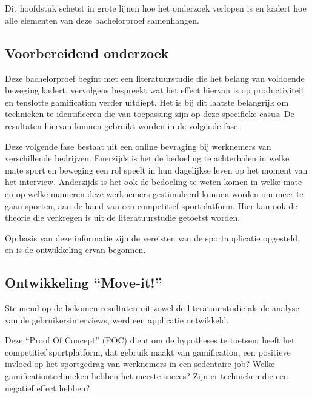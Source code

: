 
\chapter{}%
\label{ch:methodologie}

Dit hoofdstuk schetst in grote lijnen hoe het onderzoek verlopen is en kadert hoe alle elementen van deze bachelorproef samenhangen.

\section{Voorbereidend onderzoek}
Deze bachelorproef begint met een literatuurstudie die het belang van voldoende beweging kadert, vervolgens bespreekt wat het effect hiervan is op productiviteit en tenslotte gamification verder uitdiept. Het is bij dit laatste belangrijk om technieken te identificeren die van toepassing zijn op deze specifieke casus. De resultaten hiervan kunnen gebruikt worden in de volgende fase.

Deze volgende fase bestaat uit een online bevraging bij werknemers van verschillende bedrijven. Enerzijds is het de bedoeling te achterhalen in welke mate sport en beweging een rol speelt in hun dagelijkse leven op het moment van het interview. Anderzijds is het ook de bedoeling te weten komen in welke mate en op welke manieren deze werknemers gestimuleerd kunnen worden om meer te gaan sporten, aan de hand van een competitief sportplatform. Hier kan ook de theorie die verkregen is uit de literatuurstudie getoetst worden.

Op basis van deze informatie zijn de vereisten van de sportapplicatie opgesteld, en is de ontwikkeling ervan begonnen.

\section{Ontwikkeling ``Move-it!''}

Steunend op de bekomen resultaten uit zowel de literatuurstudie als de analyse van de gebruikersinterviews, werd een applicatie ontwikkeld.

Deze ``Proof Of Concept'' (POC) dient om de hypotheses te toetsen: heeft het competitief sportplatform, dat gebruik maakt van gamification, een positieve invloed op het sportgedrag van werknemers in een sedentaire job? Welke gamificationtechnieken hebben het meeste succes? Zijn er technieken die een negatief effect hebben?

